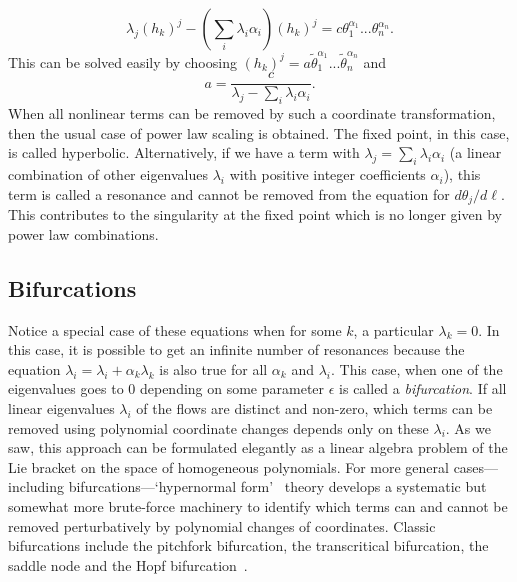 \documentclass[
 reprint,
 amsmath,amssymb,
 aps, superscriptaddress, pre
]{revtex4-1}
\begin{document}

\begin{equation}
 \lambda_j (h_k)^j - \left(\sum_i \lambda_i \alpha_i\right) (h_k)^j = c \theta_1^{\alpha_1}...\theta_n^{\alpha_n} .
\end{equation}
This can be solved easily by choosing $(h_k)^j = a {\tilde \theta}_1^{\alpha_1}...{\tilde \theta}_n^{\alpha_n}$ and
\begin{equation}
\label{normalformequation}
 a = \frac{c}{\lambda_j - \sum_i \lambda_i \alpha_i} .
\end{equation}
When all nonlinear terms can be removed by such a coordinate transformation, then the usual case of power law scaling is obtained. The fixed point, in this case, is called hyperbolic. Alternatively, if we have a term with  $\lambda_j = \sum_i \lambda_i \alpha_i$ (a linear combination of other eigenvalues $\lambda_i$ with positive integer coefficients $\alpha_i$), this term is called a resonance and cannot be removed from the equation for $d \theta_j/d \ell$. This contributes to the singularity at the fixed point which is no longer given by power law combinations. 

\subsection{Bifurcations}

Notice a special case of these equations when for some $k$, a particular $\lambda_k = 0$. In this case, it is possible to get an infinite number of resonances because the equation $\lambda_i = \lambda_i + \alpha_k \lambda_k$ is also true for all $\alpha_k$ and $\lambda_i$. This case, when one of the eigenvalues goes to 0 depending on some parameter $\epsilon$ is called a \textit{bifurcation}. If all linear eigenvalues $\lambda_i$ of the flows are distinct and
non-zero, which terms can be removed using polynomial coordinate changes
depends only on these $\lambda_i$. As we saw, this approach can be formulated
elegantly as a linear algebra problem of the Lie bracket on the space of
homogeneous polynomials.  For more
general cases---including bifurcations---`hypernormal form'~\cite{murdock2004hypernormal, yu2007simplest,
yu2002computation} theory develops a systematic but somewhat more
brute-force machinery to identify which terms can and cannot be removed
perturbatively by polynomial changes of coordinates. Classic bifurcations include the pitchfork bifurcation, the transcritical bifurcation, the saddle node and the Hopf bifurcation~\cite{GuckenheimerH13}. 
\end{document}
